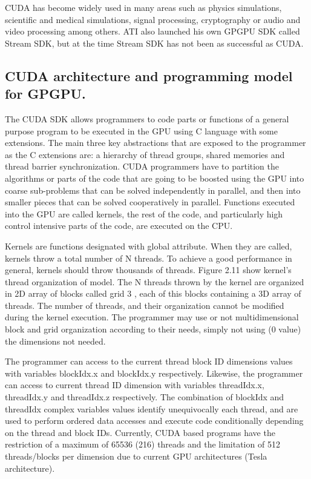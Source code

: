 \documentclass[thesis=M,english]{FITthesis}[2011/07/15]
\begin{document}
CUDA has become widely used in many areas such as physics simulations, scientific and medical simulations, signal processing, cryptography or audio and video processing among others. ATI also launched his own GPGPU SDK called Stream SDK, but at the time Stream SDK has not been as successful as CUDA.

\subsection{CUDA architecture and programming model for GPGPU.}

The CUDA SDK allows programmers to code parts or functions of a general purpose program to be executed in the GPU using C language with some extensions. The main three key abstractions that are exposed to the programmer as the C extensions are: a hierarchy of thread groups, shared memories and thread barrier synchronization. CUDA programmers have to partition the algorithms or parts of the code that are going to be boosted using the GPU into coarse sub-problems that can be solved independently in parallel, and then into smaller pieces that can be solved cooperatively in parallel. Functions executed into the GPU are called kernels, the rest of the code, and particularly
high control intensive parts of the code, are executed on the CPU. 

Kernels are functions designated with global attribute. When they are called, kernels throw a total number of N threads. To achieve a good performance in general, kernels should throw thousands of threads. Figure 2.11 show kernel’s thread organization of model. The N threads thrown by the kernel are organized in 2D array of blocks called grid 3 , each of this blocks containing a 3D array of threads. The number of threads, and their organization cannot be modified during the kernel execution. The programmer may use or not multidimensional block and grid organization according to their needs, simply not using (0 value) the dimensions not needed. 

The programmer can access to the current thread block ID dimensions values with variables blockIdx.x and blockIdx.y respectively. Likewise, the programmer can access to current thread ID dimension with variables threadIdx.x, threadIdx.y and threadIdx.z respectively. The combination of blockIdx and threadIdx complex variables values identify unequivocally each thread, and are used to perform ordered data accesses and execute code conditionally depending on the thread and block IDs. Currently, CUDA based programs have the restriction of a maximum of 65536 (216) threads and the limitation of 512 threads/blocks per dimension due to current GPU architectures (Tesla architecture).
\end{document}
